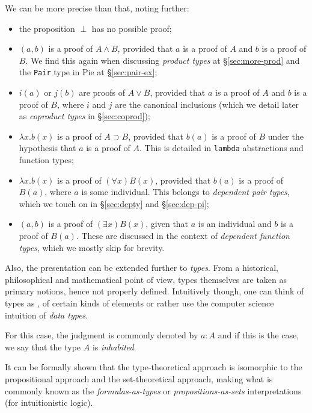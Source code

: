 We can be more precise than that, noting further:
\begin{itemize}
\item the proposition $ \perp $ has no possible proof;
\item $ (a, b) $ is a proof of $ A \land B $, provided that $ a $ is a proof
  of $ A $ and $ b $ is a proof of $ B $. We find this again when discussing
  \emph{product types} at \S\ref{sec:more-prod} and the \texttt{Pair} type in Pie
  at \S\ref{sec:pair-ex};
\item $ i(a) $ or $ j(b) $ are proofs of $ A \lor B $, provided that $ a $
  is a proof of $ A $ and $ b $ is a proof of $ B $, where $ i $ and $ j $
  are the canonical inclusions (which we detail later as \emph{coproduct types} in
  \S\ref{sec:coprod});
\item $ \lambda x . b(x) $ is a proof of $ A \supset B $, provided that
  $ b(a) $ is a proof of $ B $ under the hypothesis that $ a $ is a proof of $ A $.
  This is detailed in \texttt{lambda} abstractions and function types;
\item $ \lambda x . b(x) $ is a proof of $ (\forall x)B(x) $, provided that
  $ b(a) $ is a proof of $ B(a) $, where $ a $ is some individual. This belongs
  to \emph{dependent pair types}, which we touch on in \S\ref{sec:depty} and
  \S\ref{sec:dep-pi};
\item $ (a, b) $ is a proof of $ (\exists x)B(x) $, given that $ a $ is an
  individual and $ b $ is a proof of $ B(a) $. These are discussed in
  the context of \emph{dependent function types}, which we mostly skip for
  brevity.
\end{itemize}

Also, the presentation can be extended further to \emph{types}. From a historical,
philosophical and mathematical point of view, types themselves are taken as
primary notions, hence not properly defined. Intuitively though, one can
think of types as ,  of certain kinds of elements
or rather use the computer science intuition of \emph{data types}.

For this case, the judgment  is commonly
denoted by $ a : A $ and if this is the case, we say that the type $ A $ is
\emph{inhabited}.

It can be formally shown that the type-theoretical approach is isomorphic
to the propositional approach and the set-theoretical approach, making what
is commonly known as the \emph{formulas-as-types} or \emph{propositions-as-sets}
interpretations (for intuitionistic logic).

